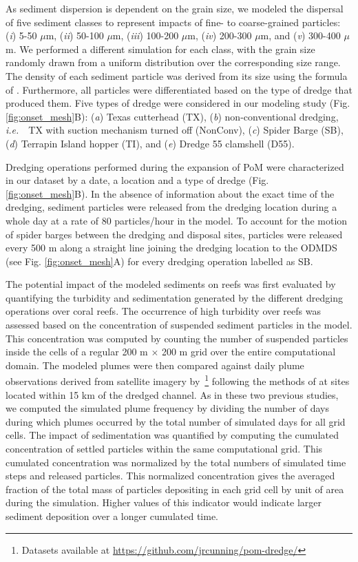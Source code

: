 \documentclass[preprint,12pt,authoryear]{elsarticle}
\newcommand{\ie}{{\it i.e.}\ }
\begin{document}
As sediment dispersion is dependent on the grain size, we modeled the dispersal of five sediment classes to represent impacts of fine- to coarse-grained particles: (\textit{i}) 5-50 $\mu$m, (\textit{ii}) 50-100 $\mu$m, (\textit{iii}) 100-200 $\mu$m, (\textit{iv}) 200-300 $\mu$m, and (\textit{v}) 300-400 $\mu$m. We performed a  different simulation for each class, with the grain size randomly drawn from a uniform distribution over the corresponding size range. The density of each sediment particle was derived from its size using the formula of \cite{hamilton1982sound}. Furthermore, all particles were differentiated based on the type of dredge that produced them. Five types of dredge were considered in our modeling study (Fig. \ref{fig:onset_mesh}B): (\textit{a}) Texas cutterhead (TX), (\textit{b}) non-conventional dredging, \ie~TX with suction mechanism turned off (NonConv), (\textit{c}) Spider Barge (SB), (\textit{d}) Terrapin Island hopper (TI), and (\textit{e}) Dredge 55 clamshell (D55).

Dredging operations performed during the expansion of PoM were characterized in our dataset by a date, a location and  a type of dredge (Fig. \ref{fig:onset_mesh}B). In the absence of information about the exact time of the dredging, sediment particles were released from the dredging location during a whole day at a rate of 80 particles/hour in the model. To account for the motion of spider barges between the dredging and disposal sites, particles were released every 500 m along a straight line joining the dredging location to the ODMDS (see Fig. \ref{fig:onset_mesh}A) for every dredging operation labelled as SB.

The potential impact of the modeled sediments on reefs was first evaluated by quantifying the turbidity and sedimentation generated by the different dredging operations over coral reefs. The occurrence of high turbidity over reefs was assessed based on the concentration of suspended sediment particles in the model. This concentration was computed by counting the number of suspended particles inside the cells of a regular 200 m $\times$ 200 m grid over the entire computational domain. The modeled plumes were then compared against daily plume observations derived from satellite imagery by~\cite{cunning2019extensive}\footnote{Datasets available at \url{https://github.com/jrcunning/pom-dredge/}} following the methods of \cite{barnes2015sediment} at sites located within 15 km of the dredged channel. As in these two previous studies, we computed  the simulated plume frequency by dividing the number of days during which plumes occurred by the total number of simulated days for all grid cells. The impact of sedimentation was quantified by computing the cumulated concentration of settled particles within the same computational grid. This cumulated concentration was normalized by the total numbers of simulated time steps and released particles. This normalized concentration gives the averaged fraction of the total mass of particles depositing in each grid cell by unit of area during the simulation. Higher values of this indicator would indicate larger sediment deposition over a longer cumulated time.
\end{document}
